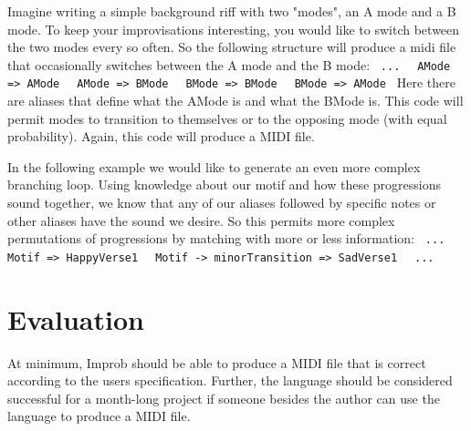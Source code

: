 \documentclass{article}
\begin{document}
Imagine writing a simple background riff with two "modes", an A mode and a B mode. To keep your improvisations interesting, you would like to switch between the two modes every so often. So the following structure will produce a midi file that occasionally switches between the A mode and the B mode: \newline
\texttt{ ... } \newline
\texttt{ AMode => AMode } \newline
\texttt{ AMode => BMode } \newline
\texttt{ BMode => BMode } \newline
\texttt{ BMode => AMode } \newline
Here there are aliases that define what the AMode is and what the BMode is. This code will permit modes to transition to themselves or to the opposing mode (with equal probability). Again, this code will produce a MIDI file.
\newline

In the following example we would like to generate an even more complex branching loop. Using knowledge about our motif and how these progressions sound together, we know that any of our aliases followed by specific notes or other aliases have the sound we desire. So this permits more complex permutations of progressions by matching with more or less information: \newline
\texttt{ ... } \newline
\texttt{ Motif => HappyVerse1 } \newline
\texttt{ Motif -> minorTransition => SadVerse1 } \newline
\texttt{ ... } \newline


\section{Evaluation}
At minimum, Improb should be able to produce a MIDI file that is correct according to the users specification. Further, the language should be considered successful for a month-long project if someone besides the author can use the language to produce a MIDI file.
\end{document}
